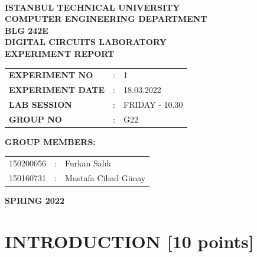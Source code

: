 \documentclass[pdftex,12pt,a4paper]{article}
\begin{document}
\begin{titlepage}
\begin{center}
\textbf{}\\
\textbf{\Large{ISTANBUL TECHNICAL UNIVERSITY}}\\
\vspace{0.5cm}
\textbf{\Large{COMPUTER ENGINEERING DEPARTMENT}}\\
\vspace{2cm}
\textbf{\Large{BLG 242E\\ DIGITAL CIRCUITS LABORATORY\\ EXPERIMENT REPORT}}\\
\vspace{2.8cm}
\begin{table}[ht]
\centering
\Large{
\begin{tabular}{lcl}
\textbf{EXPERIMENT NO}  & : & 1 \\
\textbf{EXPERIMENT DATE}  & : & 18.03.2022 \\
\textbf{LAB SESSION}  & : & FRIDAY - 10.30 \\
\textbf{GROUP NO}  & : & G22 \\
\end{tabular}}
\end{table}
\vspace{1cm}
\textbf{\Large{GROUP MEMBERS:}}\\
\begin{table}[ht]
\centering
\Large{
\begin{tabular}{rcl}
150200056  & : & Furkan Salık \\
150160731  & : & Mustafa Cihad Günay \\
\end{tabular}}
\end{table}
\vspace{2.8cm}
\textbf{\Large{SPRING 2022}}

\end{center}

\end{titlepage}

\thispagestyle{empty}
\setcounter{tocdepth}{4}
\tableofcontents
\clearpage

\setcounter{page}{1}

\section{INTRODUCTION [10 points]}
\end{document}
